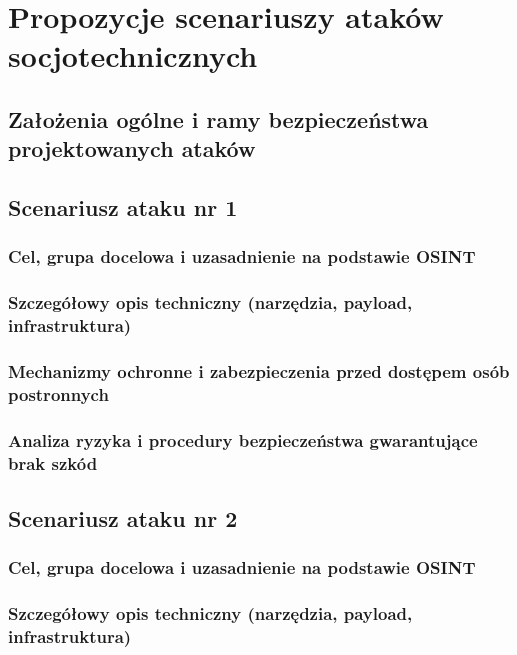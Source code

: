 \chapter{Propozycje scenariuszy ataków socjotechnicznych}\label{ch:socjotechnika}

\section{Założenia ogólne i ramy bezpieczeństwa projektowanych ataków}\label{sec:zalozenia-atakow}

\section{Scenariusz ataku nr 1}\label{sec:scenariusz-1}
\subsection{Cel, grupa docelowa i uzasadnienie na podstawie OSINT}\label{subsec:scen1-cel}
\subsection{Szczegółowy opis techniczny (narzędzia, payload, infrastruktura)}\label{subsec:scen1-techniczny}
\subsection{Mechanizmy ochronne i zabezpieczenia przed dostępem osób postronnych}\label{subsec:scen1-zabezpieczenia}
\subsection{Analiza ryzyka i procedury bezpieczeństwa gwarantujące brak szkód}\label{subsec:scen1-ryzyko}

\section{Scenariusz ataku nr 2}\label{sec:scenariusz-2}
\subsection{Cel, grupa docelowa i uzasadnienie na podstawie OSINT}\label{subsec:scen2-cel}
\subsection{Szczegółowy opis techniczny (narzędzia, payload, infrastruktura)}\label{subsec:scen2-techniczny}
